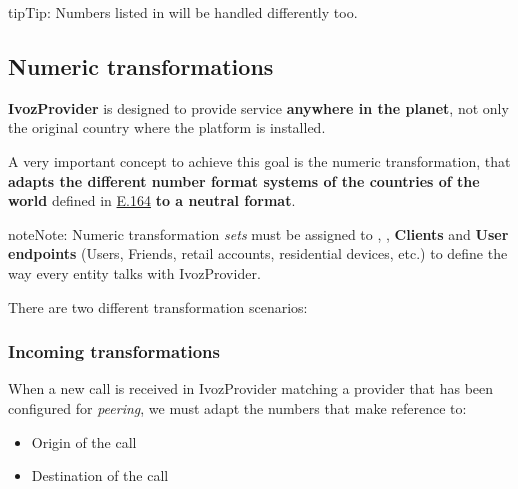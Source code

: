 \documentclass[letterpaper,10pt,english]{sphinxmanual}
\begin{document}
\begin{notice}{tip}{Tip:}
Numbers listed in {\hyperref[administration_portal/platform/global_special_numbers:global\string-special\string-numbers]{}} will be handled differently too.
\end{notice}


\subsection{Numeric transformations}
\label{administration_portal/brand/settings/numeric_transformations::doc}\label{administration_portal/brand/settings/numeric_transformations:transformations}\label{administration_portal/brand/settings/numeric_transformations:numeric-transformations}
\textbf{IvozProvider} is designed to provide service \textbf{anywhere in the planet}, not
only the original country where the platform is installed.

A very important concept to achieve this goal is the numeric transformation,
that \textbf{adapts the different number format systems of the countries of the world}
defined in \href{https://www.itu.int/rec/T-REC-E.164/es}{E.164} \textbf{to a neutral format}.

\begin{notice}{note}{Note:}
Numeric transformation \emph{sets} must be assigned to {\hyperref[administration_portal/brand/providers/carriers:carriers]{}}, {\hyperref[administration_portal/brand/providers/ddi_providers:ddi\string-providers]{}}, \textbf{Clients} and \textbf{User
endpoints} (Users, Friends, retail accounts, residential devices, etc.) to define the way every entity talks
with IvozProvider.
\end{notice}

There are two different transformation scenarios:


\subsubsection{Incoming transformations}
\label{administration_portal/brand/settings/numeric_transformations:incoming-transformations}
When a new call is received in IvozProvider matching a provider that has been
configured for \emph{peering}, we must adapt the numbers that make reference to:
\begin{itemize}
\item {} 
Origin of the call

\item {} 
Destination of the call

\end{itemize}
\end{document}
